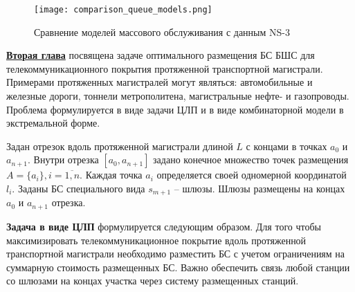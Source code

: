 
\begin{figure}[h!]
  \centering
   \texttt{[image: comparison\_queue\_models.png]}
\caption{Сравнение моделей массового обслуживания с данным NS-3}
\label{fig:comparison_queue_models}
\end{figure}




\FloatBarrier
\underline{\textbf{Вторая глава}} посвящена задаче оптимального размещения БС БШС для телекоммуникационного покрытия протяженной транспортной магистрали. Примерами протяженных магистралей могут являться: автомобильные и железные дороги, тоннели метрополитена, магистральные нефте- и газопроводы. Проблема формулируется в виде задачи ЦЛП и в виде комбинаторной модели в экстремальной форме. 

Задан отрезок вдоль протяженной магистрали длиной $L$ с концами в точках $a_0$ и $a_{n+1}$. Внутри  отрезка $[a_0, a_{n+1}]$ задано конечное множество точек размещения $A=\{a_i\}, i=\overline{1,n}$. Каждая точка $a_i$ определяется своей одномерной координатой $l_i$. Заданы БС специального вида $s_{m+1}$ -- шлюзы. Шлюзы размещены на концах $a_0$ и $a_{n+1}$ отрезка.

\textbf{Задача в виде ЦЛП} формулируется следующим образом. Для того чтобы максимизировать телекоммуникационное покрытие вдоль протяженной транспортной магистрали необходимо разместить БС с учетом ограничениям на суммарную стоимость размещенных БС. Важно обеспечить связь любой станции со шлюзами на концах участка через систему размещенных станций. 


